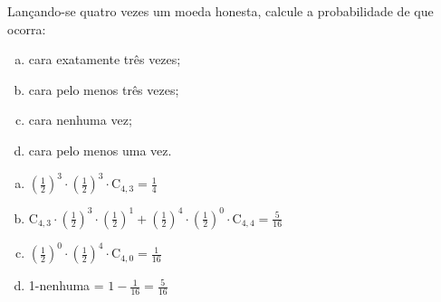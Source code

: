 \begin{ex}
 Lançando-se quatro vezes um moeda honesta, calcule a probabilidade de que ocorra:
    \begin{enumerate}[(a)]
    \item cara exatamente três vezes;
    \item cara pelo menos três vezes;
    \item cara nenhuma vez;
    \item cara pelo menos uma vez.
    \end{enumerate}
      \begin{sol}
         \phantom{A}
       \begin{enumerate} [(a)]
           \item $(\frac{1}{2})^3\cdot(\frac{1}{2})^3\cdot\mathrm{C}_{4,3}=\frac{1}{4}$
           \item $\mathrm{C}_{4,3}\cdot(\frac{1}{2})^3\cdot(\frac{1}{2})^1+(\frac{1}{2})^4\cdot(\frac{1}{2})^0\cdot\mathrm{C}_{4,4}=\frac{5}{16}$
           \item $(\frac{1}{2})^0\cdot(\frac{1}{2})^4\cdot\mathrm{C}_{4,0}=\frac{1}{16}$
           \item 1-nenhuma = $1-\frac{1}{16}=\frac{5}{16}$
       \end{enumerate}
      \end{sol}
\end{ex}